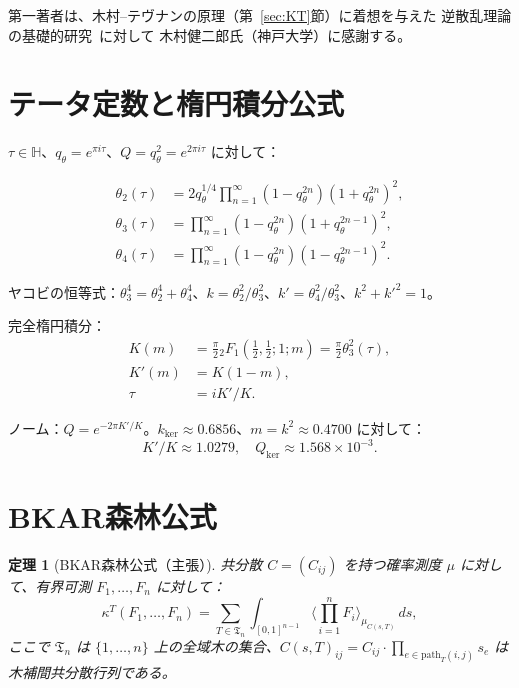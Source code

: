 \documentclass[12pt]{article}
\theoremstyle{plain}
\newtheorem{theorem}{定理}[section]
\theoremstyle{definition}
\numberwithin{equation}{section}
\newcommand{\HH}{\mathbb{H}}
\newcommand{\kker}{\mathrm{ker}}
\begin{document}
第一著者は、木村--テヴナンの原理（第~\ref{sec:KT}節）に着想を与えた
逆散乱理論の基礎的研究~\cite{Kimura2020,Kimura2021,Kimura2022}に対して
木村健二郎氏（神戸大学）に感謝する。



\appendix

\section{テータ定数と楕円積分公式}\label{app:theta}

$\tau\in\HH$、$q_\theta=e^{\pi i\tau}$、$Q=q_\theta^2=e^{2\pi i\tau}$ に対して：

\begin{align}
\theta_2(\tau) &= 2q_\theta^{1/4}\prod_{n=1}^\infty(1-q_\theta^{2n})(1+q_\theta^{2n})^2,\\
\theta_3(\tau) &= \prod_{n=1}^\infty(1-q_\theta^{2n})(1+q_\theta^{2n-1})^2,\\
\theta_4(\tau) &= \prod_{n=1}^\infty(1-q_\theta^{2n})(1-q_\theta^{2n-1})^2.
\end{align}

ヤコビの恒等式：$\theta_3^4=\theta_2^4+\theta_4^4$、$k=\theta_2^2/\theta_3^2$、$k'=\theta_4^2/\theta_3^2$、$k^2+k'^2=1$。

完全楕円積分：
\begin{align}
K(m) &= \frac{\pi}{2}{}_2F_1\!\left(\frac{1}{2},\frac{1}{2};1;m\right) = \frac{\pi}{2}\theta_3^2(\tau),\\
K'(m) &= K(1-m),\\
\tau &= iK'/K.
\end{align}

ノーム：$Q=e^{-2\pi K'/K}$。$k_{\kker}\approx 0.6856$、$m=k^2\approx 0.4700$ に対して：
\begin{equation}
K'/K\approx 1.0279,\quad Q_{\kker}\approx 1.568\times 10^{-3}.
\end{equation}


\section{BKAR森林公式}\label{app:BKAR}

\begin{theorem}[BKAR森林公式（主張）]
共分散 $C=(C_{ij})$ を持つ確率測度 $\mu$ に対して、有界可測 $F_1,\ldots,F_n$ に対して：
\begin{equation}
\kappa^T(F_1,\ldots,F_n) = \sum_{T\in\mathfrak{T}_n}\int_{[0,1]^{n-1}}\Big\langle\prod_{i=1}^n F_i\Big\rangle_{\mu_{C(s,T)}}\,ds,
\end{equation}
ここで $\mathfrak{T}_n$ は $\{1,\ldots,n\}$ 上の全域木の集合、$C(s,T)_{ij}=C_{ij}\cdot\prod_{e\in\mathrm{path}_T(i,j)}s_e$ は木補間共分散行列である。
\end{theorem}
\end{document}
